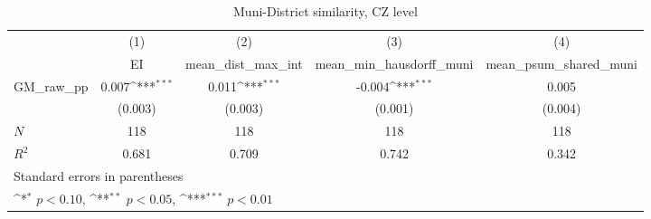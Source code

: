 \begin{table}[htbp]\centering
\def\sym#1{\ifmmode^{#1}\else\(^{#1}\)\fi}
\caption{Muni-District similarity, CZ level}
\begin{tabular}{l*{4}{c}}
\hline\hline
            &\multicolumn{1}{c}{(1)}&\multicolumn{1}{c}{(2)}&\multicolumn{1}{c}{(3)}&\multicolumn{1}{c}{(4)}\\
            &\multicolumn{1}{c}{EI}&\multicolumn{1}{c}{mean\_dist\_max\_int}&\multicolumn{1}{c}{mean\_min\_hausdorff\_muni}&\multicolumn{1}{c}{mean\_psum\_shared\_muni}\\
\hline
GM\_raw\_pp   &       0.007\sym{***}&       0.011\sym{***}&      -0.004\sym{***}&       0.005         \\
            &     (0.003)         &     (0.003)         &     (0.001)         &     (0.004)         \\
\hline
\(N\)       &         118         &         118         &         118         &         118         \\
\(R^{2}\)   &       0.681         &       0.709         &       0.742         &       0.342         \\
\hline\hline
\multicolumn{5}{l}{\footnotesize Standard errors in parentheses}\\
\multicolumn{5}{l}{\footnotesize \sym{*} \(p<0.10\), \sym{**} \(p<0.05\), \sym{***} \(p<0.01\)}\\
\end{tabular}
\end{table}
